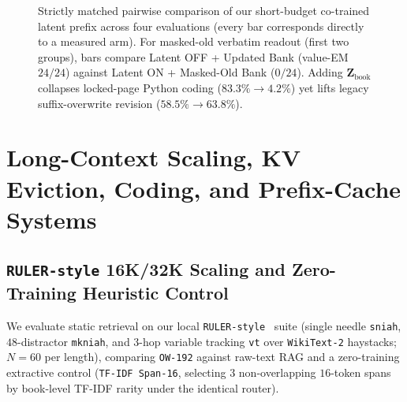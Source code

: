 \documentclass[10pt]{article}
\newcommand{\vect}[1]{\mathbf{#1}}
\renewcommand{\_}{\origunderscore\allowbreak}
\begin{document}
\begin{figure}[t]
\centering
{}
\caption{Strictly matched pairwise comparison of our short-budget co-trained latent prefix across four evaluations (every bar corresponds directly to a measured arm). For masked-old verbatim readout (first two groups), bars compare Latent OFF + Updated Bank (value-EM $24/24$) against Latent ON + Masked-Old Bank ($0/24$). Adding $\vect{Z}_{\text{book}}$ collapses locked-page Python coding ($83.3\% \rightarrow 4.2\%$) yet lifts legacy suffix-overwrite revision ($58.5\% \rightarrow 63.8\%$).}
\label{fig:latent_interaction}
\end{figure}

\section{Long-Context Scaling, KV Eviction, Coding, and Prefix-Cache Systems}
\label{sec:systems}

\subsection{\texttt{RULER-style} 16K/32K Scaling and Zero-Training Heuristic Control}
\label{sec:ruler}
We evaluate static retrieval on our local \texttt{RULER-style}~\citep{hsieh2024ruler} suite (single needle \texttt{s\_niah}, $48$-distractor \texttt{mk\_niah}, and $3$-hop variable tracking \texttt{vt} over \texttt{WikiText-2} haystacks; $N=60$ per length), comparing \texttt{OW-192} against raw-text RAG and a zero-training extractive control (\texttt{TF-IDF Span-16}, selecting $3$ non-overlapping $16$-token spans by book-level TF-IDF rarity under the identical router).
\end{document}
